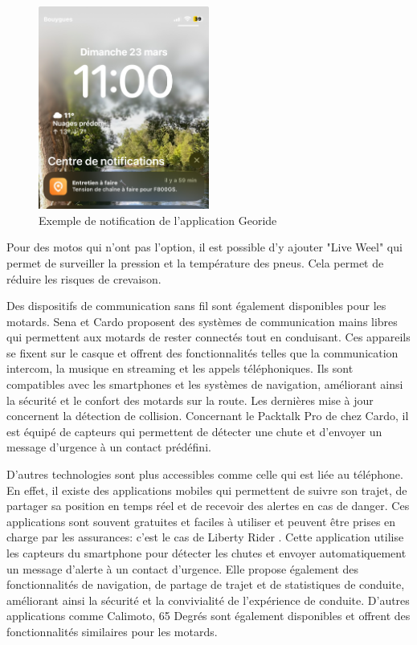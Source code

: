 \begin{figure}[H]
    \centering
    \includegraphics[width=0.5\textwidth]{images/notification_georide.jpg} 
    \caption{Exemple de notification de l'application Georide}
\end{figure}
Pour des motos qui n'ont pas l'option, il est possible d'y ajouter "Live Weel" qui permet de surveiller la pression et la température des pneus. Cela permet de réduire les risques de crevaison.
\vspace{0.5cm}

Des dispositifs de communication sans fil sont également disponibles pour les motards. Sena et Cardo\cite{cardo} proposent des systèmes de communication mains libres qui permettent aux motards de rester connectés tout en conduisant. Ces appareils se fixent sur le casque et offrent des fonctionnalités telles que la communication intercom, la musique en streaming et les appels téléphoniques. Ils sont compatibles avec les smartphones et les systèmes de navigation, améliorant ainsi la sécurité et le confort des motards sur la route. Les dernières mise à jour concernent la détection de collision. Concernant le Packtalk Pro de chez Cardo, il est équipé de capteurs qui permettent de détecter une chute et d'envoyer un message d'urgence à un contact prédéfini.

D'autres technologies sont plus accessibles comme celle qui est liée au téléphone. En effet, il existe des applications mobiles qui permettent de suivre son trajet, de partager sa position en temps réel et de recevoir des alertes en cas de danger. Ces applications sont souvent gratuites et faciles à utiliser et peuvent être prises en charge par les assurances: c'est le cas de Liberty Rider \cite{liberty_rider}. Cette application utilise les capteurs du smartphone pour détecter les chutes et envoyer automatiquement un message d'alerte à un contact d’urgence. Elle propose également des fonctionnalités de navigation, de partage de trajet et de statistiques de conduite, améliorant ainsi la sécurité et la convivialité de l’expérience de conduite. D'autres applications comme Calimoto, 65 Degrés sont également disponibles et offrent des fonctionnalités similaires pour les motards.

